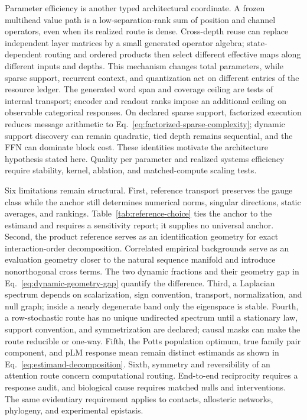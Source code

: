 \documentclass[10pt]{article}
\theoremstyle{definition}
\theoremstyle{remark}
\begin{document}
Parameter efficiency is another typed architectural coordinate.  A frozen multihead value path is
a low-separation-rank sum of position and channel operators, even when its realized route is dense.
Cross-depth reuse can replace independent layer matrices by a small generated operator algebra;
state-dependent routing and ordered products then select different effective maps along different
inputs and depths.  This mechanism changes total parameters, while sparse support, recurrent
context, and quantization act on different entries of the resource ledger.  The generated word
span and coverage ceiling are tests of internal transport; encoder and readout ranks impose an
additional ceiling on observable categorical responses.  On declared sparse support, factorized execution
reduces message arithmetic to Eq.~\ref{eq:factorized-sparse-complexity}; dynamic support discovery
can remain quadratic, tied depth remains sequential, and the FFN can dominate block cost.  These
identities motivate the architecture hypothesis stated here.  Quality per parameter and
realized systems efficiency require stability, kernel, ablation, and matched-compute scaling tests.

Six limitations remain structural.  First, reference transport preserves the gauge class while the
anchor still determines numerical norms, singular directions, static averages, and rankings.
Table~\ref{tab:reference-choice} ties the anchor to the estimand and requires a sensitivity report;
it supplies no universal anchor.  Second, the product reference serves as an identification
geometry for exact interaction-order decomposition.  Correlated empirical backgrounds serve as an
evaluation geometry closer to the natural sequence manifold and introduce nonorthogonal cross
terms.  The two dynamic fractions and their geometry gap in
Eq.~\ref{eq:dynamic-geometry-gap} quantify the difference.  Third, a Laplacian
spectrum depends on scalarization, sign convention, transport, normalization, and null graph;
inside a nearly degenerate band only the eigenspace is stable.  Fourth, a row-stochastic route has
no unique undirected spectrum until a stationary law, support convention, and symmetrization are
declared; causal masks can make the route reducible or one-way.  Fifth, the Potts population
optimum, true family pair component, and pLM response mean remain distinct estimands as shown in
Eq.~\ref{eq:estimand-decomposition}.  Sixth, symmetry and reversibility of an attention route concern
computational routing.  End-to-end reciprocity requires a response audit, and biological cause
requires matched nulls and interventions.  The same evidentiary requirement applies to contacts,
allosteric networks, phylogeny, and experimental epistasis.
\end{document}
